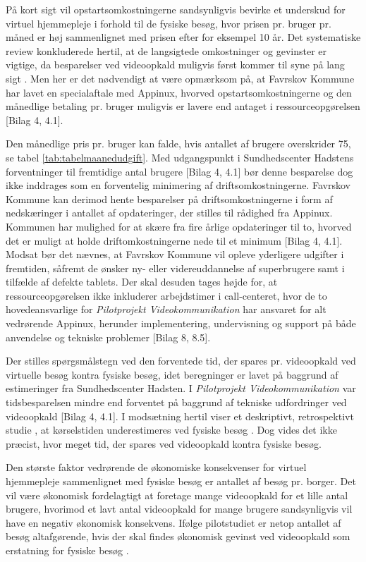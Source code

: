 På kort sigt vil opstartsomkostningerne sandsynligvis bevirke et underskud for virtuel hjemmepleje i forhold til de fysiske besøg, hvor prisen pr. bruger pr. måned er høj sammenlignet med prisen efter for eksempel 10 år. Det systematiske review  konkluderede hertil, at de langsigtede omkostninger og gevinster er vigtige, da besparelser ved videoopkald muligvis først kommer til syne på lang sigt \cite{jose}. Men her er det nødvendigt at være opmærksom på, at Favrskov Kommune har lavet en specialaftale med Appinux, hvorved opstartsomkostningerne og den månedlige betaling pr. bruger muligvis er lavere end antaget i ressourceopgørelsen [Bilag 4, 4.1]. 


Den månedlige pris pr. bruger kan falde, hvis antallet af brugere overskrider 75, se tabel \ref{tab:tabelmaanedudgift}. Med udgangspunkt i Sundhedscenter Hadstens forventninger til fremtidige antal brugere [Bilag 4, 4.1] bør denne besparelse dog ikke inddrages som en forventelig minimering af driftsomkostningerne. 
Favrskov Kommune kan derimod hente besparelser på driftsomkostningerne i form af nedskæringer i antallet af opdateringer, der stilles til rådighed fra Appinux. Kommunen har mulighed for at skære fra fire årlige opdateringer til to, hvorved det er muligt at holde driftomkostningerne nede til et minimum [Bilag 4, 4.1].
Modsat bør det nævnes, at Favrskov Kommune vil opleve yderligere udgifter i fremtiden, såfremt de ønsker ny- eller videreuddannelse af superbrugere samt i tilfælde af defekte tablets.  
Der skal desuden tages højde for, at ressourceopgørelsen ikke inkluderer arbejdstimer i call-centeret, hvor de to hovedeansvarlige for \textit{Pilotprojekt Videokommunikation} har ansvaret for alt vedrørende Appinux, herunder implementering, undervisning og support på både anvendelse og tekniske problemer [Bilag 8, 8.5].

Der stilles spørgsmålstegn ved den forventede tid, der spares pr. videoopkald ved virtuelle besøg kontra fysiske besøg, idet beregninger er lavet på baggrund af estimeringer fra Sundhedscenter Hadsten. I \textit{Pilotprojekt Videokommunikation} var tidsbesparelsen mindre end forventet på baggrund af tekniske udfordringer ved videoopkald [Bilag 4, 4.1]. 
I modsætning hertil viser et deskriptivt, retrospektivt studie , at kørselstiden underestimeres ved fysiske besøg \cite{solrun}. Dog vides det ikke præcist, hvor meget tid, der spares ved videoopkald kontra fysiske besøg.

Den største faktor vedrørende de økonomiske konsekvenser for virtuel hjemmepleje sammenlignet med fysiske besøg er antallet af besøg pr. borger. Det vil være økonomisk fordelagtigt at foretage mange videoopkald for et lille antal brugere, hvorimod et lavt antal videoopkald for mange brugere sandsynligvis vil have en negativ økonomisk konsekvens. 
Ifølge pilotstudiet  er netop antallet af besøg altafgørende, hvis der skal findes økonomisk gevinst ved videoopkald som erstatning for fysiske besøg \cite{cost}. 


